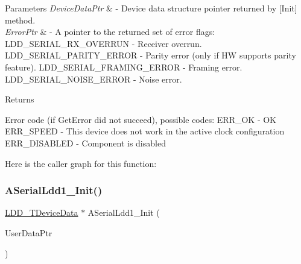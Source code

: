 \begin{DoxyParams}{Parameters}
{\em Device\+Data\+Ptr} & -\/ Device data structure pointer returned by \mbox{[}Init\mbox{]} method. \\
\hline
{\em Error\+Ptr} & -\/ A pointer to the returned set of error flags\+: L\+D\+D\+\_\+\+S\+E\+R\+I\+A\+L\+\_\+\+R\+X\+\_\+\+O\+V\+E\+R\+R\+UN -\/ Receiver overrun. L\+D\+D\+\_\+\+S\+E\+R\+I\+A\+L\+\_\+\+P\+A\+R\+I\+T\+Y\+\_\+\+E\+R\+R\+OR -\/ Parity error (only if HW supports parity feature). L\+D\+D\+\_\+\+S\+E\+R\+I\+A\+L\+\_\+\+F\+R\+A\+M\+I\+N\+G\+\_\+\+E\+R\+R\+OR -\/ Framing error. L\+D\+D\+\_\+\+S\+E\+R\+I\+A\+L\+\_\+\+N\+O\+I\+S\+E\+\_\+\+E\+R\+R\+OR -\/ Noise error. \\
\hline
\end{DoxyParams}
\begin{DoxyReturn}{Returns}

\begin{DoxyItemize}
\item Error code (if Get\+Error did not succeed), possible codes\+: E\+R\+R\+\_\+\+OK -\/ OK E\+R\+R\+\_\+\+S\+P\+E\+ED -\/ This device does not work in the active clock configuration E\+R\+R\+\_\+\+D\+I\+S\+A\+B\+L\+ED -\/ Component is disabled 
\end{DoxyItemize}
\end{DoxyReturn}
Here is the caller graph for this function\+:
\mbox{\label{group___a_serial_ldd1__module_ga72a2988ac3b4e592eb9dd9c9cf0db38f}} 
\subsubsection{\texorpdfstring{A\+Serial\+Ldd1\+\_\+\+Init()}{ASerialLdd1\_Init()}}
{\footnotesize\ttfamily \hyperlink{group___p_e___types__module_gac5cf1362f1f0e3a2ce71b1bf2276d091}{L\+D\+D\+\_\+\+T\+Device\+Data} $\ast$ A\+Serial\+Ldd1\+\_\+\+Init (\begin{DoxyParamCaption}\item[{\hyperlink{group___p_e___types__module_ga0b66a73f87238a782318aa0be7578e35}{L\+D\+D\+\_\+\+T\+User\+Data} $\ast$}]{User\+Data\+Ptr }\end{DoxyParamCaption})}



